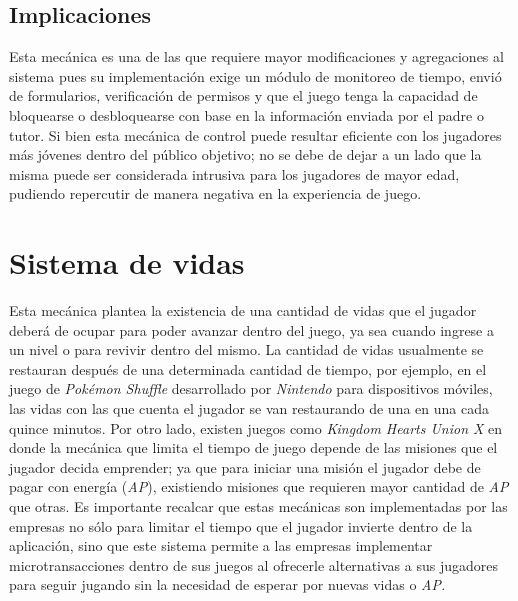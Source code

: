 \subsection{Implicaciones}
Esta mecánica es una de las que requiere mayor modificaciones y agregaciones al
sistema pues su implementación exige un módulo de monitoreo de tiempo, envió de
formularios, verificación de permisos y que el juego tenga la capacidad de
bloquearse o desbloquearse con base en la información enviada por el padre o
tutor. Si bien esta mecánica de control puede resultar eficiente con los
jugadores más jóvenes dentro del público objetivo; no se debe de dejar a un lado
que la misma puede ser considerada intrusiva para los jugadores de mayor edad,
pudiendo repercutir de manera negativa en la experiencia de juego.

\section{Sistema de vidas}
Esta mecánica plantea la existencia de una cantidad de vidas que el jugador
deberá de ocupar para poder avanzar dentro del juego, ya sea cuando ingrese a un
nivel o para revivir dentro del mismo. La cantidad de vidas usualmente se
restauran después de una determinada cantidad de tiempo, por ejemplo, en el
juego de \textit{Pokémon Shuffle} desarrollado por \textit{Nintendo} para
dispositivos móviles, las vidas con las que cuenta el jugador se van restaurando
de una en una cada quince minutos.  Por otro lado, existen juegos como\textit{
Kingdom Hearts Union X} en donde la mecánica que limita el tiempo de juego
depende de las misiones que el jugador decida emprender; ya que para iniciar una
misión el jugador debe de pagar con energía (\textit{AP}), existiendo misiones
que requieren mayor cantidad de \textit{AP} que otras. Es importante recalcar
que estas mecánicas son implementadas por las empresas no sólo para limitar el
tiempo que el jugador invierte dentro de la aplicación, sino que este sistema
permite a las empresas implementar microtransacciones dentro de sus juegos al
ofrecerle alternativas a sus jugadores para seguir jugando sin la necesidad de
esperar por nuevas vidas o \textit{AP.}  
